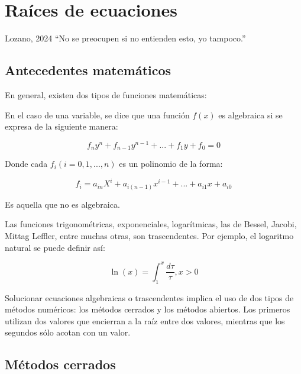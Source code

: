 \chapter{Raíces de ecuaciones}

\begin{chapquote}{Lozano, 2024}
    ``No se preocupen si no entienden esto, yo tampoco.''
\end{chapquote}


\section{Antecedentes matemáticos}

En general, existen dos tipos de funciones matemáticas:

\begin{definition}
    En el caso de una variable, se dice que una función \(f(x)\) es
    algebraica si se expresa de la siguiente manera:

    \[
        f_n y^n + f_{n-1} y^{n-1} + ... + f_1 y + f_0 = 0
    \]

    Donde cada \(f_i (i = 0, 1, ..., n)\) es un polinomio de la forma:

    \[
        f_i = a_{in} X^i + a_{i(n-1)} x^{i-1} + ... + a_{i1} x + a_{i0}
    \]
\end{definition}

\begin{definition}
    Es aquella que no es algebraica.
\end{definition}

\begin{eg}
    Las funciones trigonométricas, exponenciales, logarítmicas, las de
    Bessel, Jacobi, Mittag Leffler, entre muchas otras, son trascendentes.
    Por ejemplo, el logaritmo natural se puede definir así:

    \[
        \boxed{\ln(x) = \int_1^x \frac{d \tau}{\tau}, x > 0}
    \]

\end{eg}

Solucionar ecuaciones algebraicas o trascendentes implica el uso de dos tipos
de métodos numéricos: los métodos cerrados y los métodos abiertos. Los primeros
utilizan dos valores que encierran a la raíz entre dos valores, mientras que
los segundos sólo acotan con un valor.

\section{Métodos cerrados}

